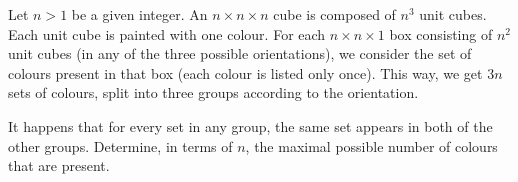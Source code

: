 Let 
$n  > 1$
 be a given integer. An 
$n \times n \times n$
 cube is composed of 
$n^3$
 unit cubes. Each unit cube is painted with one colour. For each 
$n \times n \times 1$
 box consisting of 
$n^2$
 unit cubes (in any of the three possible orientations), we consider the set of colours present in that box (each colour is listed only once). This way, we get 
$3n$
 sets of colours, split into three groups according to the orientation.


It happens that for every set in any group, the same set appears in both of the other groups. Determine, in terms of 
$n$,
 the maximal possible number of colours that are present.
